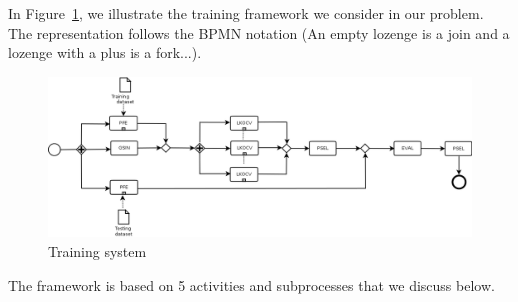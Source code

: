 \documentclass[10pt, conference, compsocconf]{IEEEtran}
\begin{document}
In Figure~\ref{fig:training}, we illustrate the training framework we consider in our problem. The representation follows the 
BPMN notation (An empty lozenge is a join and a lozenge with a plus is a fork...). 

	\begin{figure}[htbp]
	\centering
	\includegraphics[width=13cm, height=5 cm]{./Figures/workflow.png}
	\caption{Training system}
	\label{fig:training}
	\end{figure}

The framework is based on 5 activities and subprocesses that we discuss below.
\end{document}
